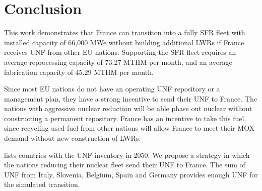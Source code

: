 \section{Conclusion}

This work demonstrates that France can transition into
a fully \gls{SFR} fleet with installed capacity of 66,000 \gls{MWe} without
building additional \glspl{LWR}
if France receives \gls{UNF} from other \gls{EU} nations.
Supporting the \gls{SFR} fleet requires an average 
reprocessing capacity of 73.27 \gls{MTHM} per month,
and an average fabrication capacity of 45.29 \gls{MTHM} per month.


Since most \gls{EU} nations do not have an operating \gls{UNF}
repository or a management plan, they have a strong incentive
to send their \gls{UNF} to France. The nations
with aggressive nuclear reduction will be able phase out nuclear
without constructing a permanent repository. France has an
incentive to take this fuel, since recycling used fuel from
other nations will allow France to meet their MOX demand
without new construction of \glspl{LWR}.

 lists countries with the \gls{UNF} inventory
in 2050. We propose a strategy in which 
the nations reducing their nuclear fleet send their \gls{UNF} to France.
The sum of \gls{UNF} from Italy, Slovenia, Belgium, Spain and Germany
provides enough \gls{UNF} for the simulated transition.

